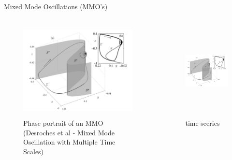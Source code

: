 \documentclass[11pt]{beamer}
\begin{document}
\begin{frame}{Mixed Mode Oscillations (MMO's)}
\begin{columns}
	\begin{figure}
		
		\includegraphics[height=5cm,width=6cm]{Images/phase-MMO}
		\caption{Phase portrait of an MMO (Desroches et al - Mixed Mode Oscillation with Multiple Time Scales)}
		
	\end{figure}
\begin{figure}
	\includegraphics[height=5cm,width=6cm]{Images/phase-MMO}
	\caption{time seeries}
	
\end{figure}

\end{columns}
\end{frame}
\end{document}

